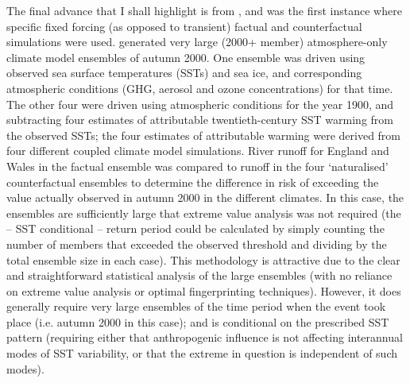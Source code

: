    The final advance that I shall highlight is from \citet{pall_anthropogenic_2011}, and was the first instance where specific fixed forcing (as opposed to transient) factual and counterfactual simulations were used. \citeauthor{pall_anthropogenic_2011} generated very large (2000+ member) atmosphere-only climate model ensembles of autumn 2000. One ensemble was driven using observed sea surface temperatures (SSTs) and sea ice, and corresponding atmospheric conditions (GHG, aerosol and ozone concentrations) for that time. The other four were driven using atmospheric conditions for the year 1900, and subtracting four estimates of attributable twentieth-century SST warming from the observed SSTs; the four estimates of attributable warming were derived from four different coupled climate model simulations. River runoff for England and Wales in the factual ensemble was compared to runoff in the four `naturalised' counterfactual ensembles to determine the difference in risk of exceeding the value actually observed in autumn 2000 in the different climates. In this case, the ensembles are sufficiently large that extreme value analysis was not required (the -- SST conditional -- return period could be calculated by simply counting the number of members that exceeded the observed threshold and dividing by the total ensemble size in each case). This methodology is attractive due to the clear and straightforward statistical analysis of the large ensembles (with no reliance on extreme value analysis or optimal fingerprinting techniques). However, it does generally require very large ensembles of the time period when the event took place (i.e. autumn 2000 in this case); and is conditional on the prescribed SST pattern (requiring either that anthropogenic influence is not affecting interannual modes of SST variability, or that the extreme in question is independent of such modes).

